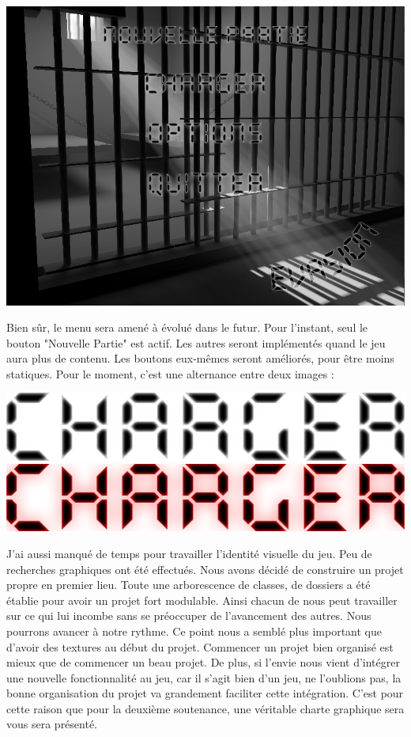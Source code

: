 \documentclass{article}
\begin{document}
 \begin{center}
\includegraphics[scale=0.3]{menu}
\end{center}


Bien sûr, le menu sera amené à évolué dans le futur. Pour l'instant, seul le bouton "Nouvelle Partie" est actif. Les autres seront implémentés quand le jeu aura plus de contenu. Les boutons eux-mêmes seront améliorés, pour être moins statiques. Pour le moment, c'est une alternance entre deux images :

\begin{center}
\includegraphics[scale=0.35]{off}
\hspace*{1.0cm}
\includegraphics[scale=0.35]{on}
\end{center}

\newpage
J'ai aussi manqué de temps pour travailler l'identité visuelle du jeu. Peu de recherches graphiques ont été effectués. Nous avons décidé de construire un projet propre en premier lieu. Toute une arborescence de classes, de dossiers a été établie pour avoir un projet fort modulable. Ainsi chacun de nous peut travailler sur ce qui lui incombe sans se préoccuper de l'avancement des autres. Nous pourrons avancer à notre rythme. Ce point nous a semblé plus important que d'avoir des textures au début du projet. Commencer un projet bien organisé est mieux que de commencer un beau projet. De plus, si l'envie nous vient d'intégrer une nouvelle fonctionnalité au jeu, car il s'agit bien d'un jeu, ne l'oublions pas, la bonne organisation du projet va grandement faciliter cette intégration. C'est pour cette raison que pour la deuxième soutenance, une véritable charte graphique sera vous sera présenté.
\newpage
\end{document}
